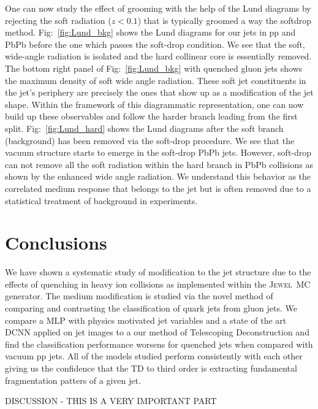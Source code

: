 \documentclass[notoc]{JHEP3}
\newcommand{\jw}{\textsc{Jewel}~}
\begin{document}
One can now study the effect of grooming with the help of the Lund diagrams by rejecting the soft radiation ($z < 0.1$) that is typically groomed a way the softdrop method. Fig:~\ref{fig:Lund_bkg} shows the Lund diagrams for our jets in pp and PbPb  before the one which passes the soft-drop condition. We see that the soft, wide-angle radiation is isolated and the hard collinear core is essentially removed. The bottom right panel of Fig:~\ref{fig:Lund_bkg} with quenched gluon jets shows the maximum density of soft wide angle radiation. These soft jet constituents in the jet's periphery are precisely the ones that show up as a modification of the jet shape. Within the framework of this diagrammatic representation, one can now build up these observables and follow the harder branch leading from the first split. Fig:~\ref{fig:Lund_hard} shows the Lund diagrams after the soft branch (background) has been removed via the soft-drop procedure. We see that the vacuum structure starts to emerge in the soft-drop PbPb jets. However, soft-drop can not remove all the soft radiation within the hard branch in PbPb collisions as shown by the enhanced wide angle radiation. We understand this behavior as the correlated medium response that belongs to the jet but is often removed due to a statistical treatment of background in experiments.

\section{Conclusions}
\label{sec:conc}

We have shown a systematic study of modification to the jet structure due to the effects of quenching in heavy ion collisions as implemented within the \jw MC generator. The medium modification is studied via the novel method of comparing and contrasting the classification of quark jets from gluon jets. We compare a MLP with physics motivated jet variables and a state of the art DCNN applied on jet images to a our method of Telescoping Deconstruction and find the classification performance worsens for quenched jets when compared with vacuum pp jets. All of the models studied perform consistently with each other giving us the confidence that the TD to third order is extracting fundamental fragmentation patters of a given jet.

DISCUSSION - THIS IS A VERY IMPORTANT PART
\end{document}
